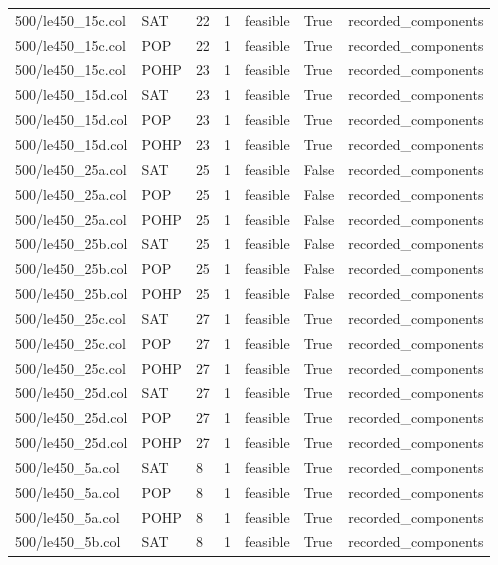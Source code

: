 \begin{table}[htbp]
\begin{tabular}{lllllll}
500/le450\_15c.col & SAT & 22 & 1 & feasible & True & recorded\_components \\
500/le450\_15c.col & POP & 22 & 1 & feasible & True & recorded\_components \\
500/le450\_15c.col & POHP & 23 & 1 & feasible & True & recorded\_components \\
500/le450\_15d.col & SAT & 23 & 1 & feasible & True & recorded\_components \\
500/le450\_15d.col & POP & 23 & 1 & feasible & True & recorded\_components \\
500/le450\_15d.col & POHP & 23 & 1 & feasible & True & recorded\_components \\
500/le450\_25a.col & SAT & 25 & 1 & feasible & False & recorded\_components \\
500/le450\_25a.col & POP & 25 & 1 & feasible & False & recorded\_components \\
500/le450\_25a.col & POHP & 25 & 1 & feasible & False & recorded\_components \\
500/le450\_25b.col & SAT & 25 & 1 & feasible & False & recorded\_components \\
500/le450\_25b.col & POP & 25 & 1 & feasible & False & recorded\_components \\
500/le450\_25b.col & POHP & 25 & 1 & feasible & False & recorded\_components \\
500/le450\_25c.col & SAT & 27 & 1 & feasible & True & recorded\_components \\
500/le450\_25c.col & POP & 27 & 1 & feasible & True & recorded\_components \\
500/le450\_25c.col & POHP & 27 & 1 & feasible & True & recorded\_components \\
500/le450\_25d.col & SAT & 27 & 1 & feasible & True & recorded\_components \\
500/le450\_25d.col & POP & 27 & 1 & feasible & True & recorded\_components \\
500/le450\_25d.col & POHP & 27 & 1 & feasible & True & recorded\_components \\
500/le450\_5a.col & SAT & 8 & 1 & feasible & True & recorded\_components \\
500/le450\_5a.col & POP & 8 & 1 & feasible & True & recorded\_components \\
500/le450\_5a.col & POHP & 8 & 1 & feasible & True & recorded\_components \\
500/le450\_5b.col & SAT & 8 & 1 & feasible & True & recorded\_components \\

\end{tabular}
\end{table}
